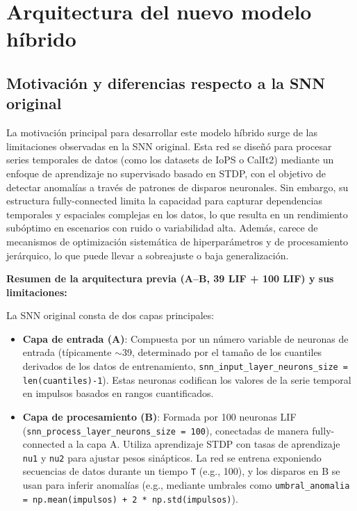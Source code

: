 \section{Arquitectura del nuevo modelo híbrido}

\subsection{ Motivación y diferencias respecto a la SNN original}

La motivación principal para desarrollar este modelo híbrido surge de las limitaciones observadas en la SNN original. Esta red se diseñó para procesar series temporales de datos (como los datasets de IoPS o CalIt2) mediante un enfoque de aprendizaje no supervisado basado en STDP, con el objetivo de detectar anomalías a través de patrones de disparos neuronales. Sin embargo, su estructura fully-connected limita la capacidad para capturar dependencias temporales y espaciales complejas en los datos, lo que resulta en un rendimiento subóptimo en escenarios con ruido o variabilidad alta. Además, carece de mecanismos de optimización sistemática de hiperparámetros y de procesamiento jerárquico, lo que puede llevar a sobreajuste o baja generalización.

\textbf{Resumen de la arquitectura previa (A--B, 39 LIF + 100 LIF) y sus limitaciones:}

La SNN original consta de dos capas principales:
\begin{itemize}
    \item \textbf{Capa de entrada (A)}: Compuesta por un número variable de neuronas de entrada (típicamente $\sim$39, determinado por el tamaño de los cuantiles derivados de los datos de entrenamiento, \texttt{snn\_input\_layer\_neurons\_size = len(cuantiles)-1}). Estas neuronas codifican los valores de la serie temporal en impulsos basados en rangos cuantificados.
    \item \textbf{Capa de procesamiento (B)}: Formada por 100 neuronas LIF (\texttt{snn\_process\_layer\_neurons\_size = 100}), conectadas de manera fully-connected a la capa A. Utiliza aprendizaje STDP con tasas de aprendizaje \texttt{nu1} y \texttt{nu2} para ajustar pesos sinápticos. La red se entrena exponiendo secuencias de datos durante un tiempo \texttt{T} (e.g., 100), y los disparos en B se usan para inferir anomalías (e.g., mediante umbrales como \texttt{umbral\_anomalia = np.mean(impulsos) + 2 * np.std(impulsos)}).
\end{itemize}

